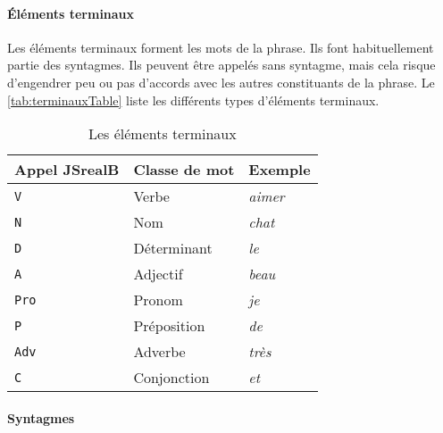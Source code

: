 \documentclass[11pt]{article} %
\newcommand{\system}[1]{\textsf{#1}}
\newcommand{\JSB}{\system{JSrealB}}
\newcommand{\real}[1]{\emph{#1}}
\begin{document}
\paragraph{Éléments terminaux}

Les éléments terminaux forment les mots de la phrase.
Ils font habituellement partie des syntagmes. Ils peuvent être
appelés sans syntagme, mais cela risque d'engendrer peu ou pas d'accords
avec les autres constituants de la phrase.
Le \autoref{tab:terminauxTable} liste les différents types d'éléments terminaux.

\begin{table}[ht]
\centering
\caption{Les éléments terminaux}
\label{tab:terminauxTable}
\begin{tabular}{|l|l|l|}
\hline 
\multicolumn{1}{|c}{Appel \JSB{}}  & \multicolumn{1}{|c}{Classe de mot} & \multicolumn{1}{|c|}{Exemple}\\
\hline 
\hline 
\texttt{V} & Verbe & \real{aimer}\\
\hline 
\texttt{N} & Nom & \real{chat}\\
\hline 
\texttt{D} & Déterminant & \real{le}\\
\hline 
\texttt{A} & Adjectif & \real{beau}\\
\hline 
\texttt{Pro} & Pronom & \real{je}\\
\hline 
\texttt{P} & Préposition & \real{de}\\
\hline 
\texttt{Adv} & Adverbe & \real{très}\\
\hline 
\texttt{C} & Conjonction & \real{et}\\
\hline 
\end{tabular}
\end{table}

\paragraph{Syntagmes}
\end{document}
